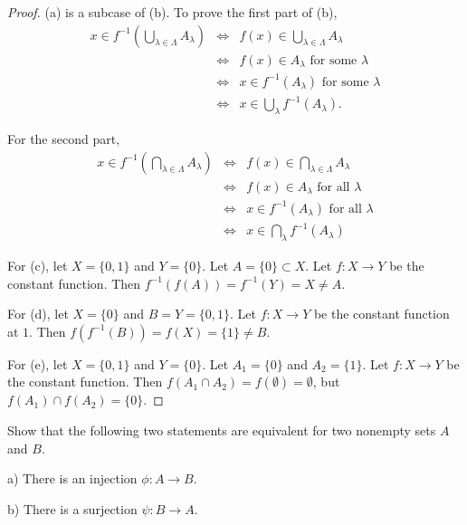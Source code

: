 \documentclass{article}
\begin{document}
\begin{proof}
(a) is a subcase of (b).  To prove the first part of (b), 
\begin{align*}
x \in f^{-1}(\bigcup_{\lambda \in \Lambda} A_\lambda) & \iff & 
f(x) \in \bigcup_{\lambda \in \Lambda} A_\lambda 
\\ & \iff & f(x) \in A_\lambda \text{ for some } \lambda
\\ & \iff & x \in f^{-1}(A_\lambda) \text{ for some } \lambda
\\ & \iff & x \in \bigcup_\lambda f^{-1}(A_\lambda).
\end{align*}

For the second part,
\begin{align*}
x \in f^{-1}(\bigcap_{\lambda \in \Lambda} A_\lambda) & \iff & 
f(x) \in \bigcap_{\lambda \in \Lambda} A_\lambda 
\\ & \iff & f(x) \in A_\lambda \text{ for all } \lambda
\\ & \iff & x \in f^{-1}(A_\lambda) \text { for all } \lambda
\\ & \iff & x \in \bigcap_\lambda f^{-1}(A_\lambda) 
\end{align*}

For (c), let $X = \{0,1\}$ and $Y = \{0\}$.  Let $A = \{0\} \subset X$.  Let $f:X \to Y$ be the constant function.  Then $f^{-1}(f(A)) = f^{-1}(Y) = X \neq A$.

For (d), let $X = \{0\}$ and $B = Y = \{0, 1\}$.   Let $f:X \to Y$ be the constant function at $1$. Then $f(f^{-1}(B)) = f(X) = \{1\} \neq B$.

For (e), let $X = \{0,1\}$ and $Y = \{0\}$. Let $A_1 = \{0\}$ and $A_2 = \{ 1 \}$.  Let $f:X \to Y$ be the constant function.  Then $f(A_1 \cap A_2) = f(\emptyset) = \emptyset$, but $f(A_1) \cap f(A_2) = \{0\}$.

\end{proof}

 Show that the following two statements are equivalent for two nonempty sets $A$ and $B$.

a) There is an injection $\phi : A \to B$.

b) There is a surjection $\psi : B \to A$.
\end{document}
